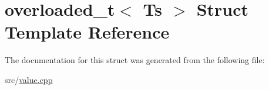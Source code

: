 \hypertarget{structoverloaded__t}{}\section{overloaded\+\_\+t$<$ Ts $>$ Struct Template Reference}
\label{structoverloaded__t}


The documentation for this struct was generated from the following file\+:\begin{DoxyCompactItemize}
\item 
src/\hyperlink{value_8cpp}{value.\+cpp}\end{DoxyCompactItemize}
